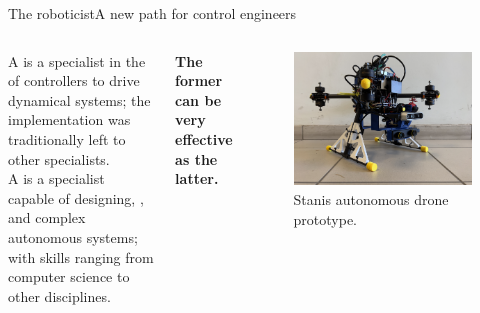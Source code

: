 \begin{frame}{The roboticist}{A new path for control engineers}
	\begin{columns}
		A  is a specialist in the  of controllers to drive dynamical systems; the implementation was traditionally left to other specialists.\\
		A  is a specialist capable of designing, , and  complex autonomous systems; with skills ranging from computer science to other disciplines.
		\begin{block}{}
			\centering
			\textbf{The former can be very effective as the latter.}
		\end{block}

		\begin{figure}
			\centering
			\includegraphics[width=.8\textwidth]{stanis}
			\caption{Stanis autonomous drone prototype.}
			\label{fig:stanis}
		\end{figure}
	\end{columns}
\end{frame}
